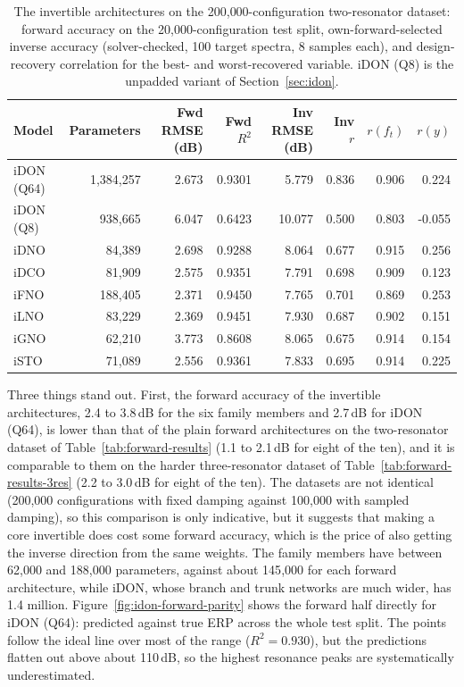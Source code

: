 \begin{table}[h]
\centering
\caption[Invertible operator comparison]{The invertible architectures on the 200{,}000-configuration two-resonator dataset: forward accuracy on the 20{,}000-configuration test split, own-forward-selected inverse accuracy (solver-checked, 100 target spectra, 8 samples each), and design-recovery correlation for the best- and worst-recovered variable. iDON (Q8) is the unpadded variant of Section~\ref{sec:idon}.}
\label{tab:inverse-ifno}
\small
\setlength{\tabcolsep}{4pt}
\begin{tabular}{lrrrrrrr}
\hline
Model & Parameters & Fwd RMSE (dB) & Fwd $R^2$ & Inv RMSE (dB) & Inv $r$ & $r(f_t)$ & $r(y)$ \\
\hline
iDON (Q64) & 1{,}384{,}257 & 2.673 & 0.9301 & 5.779 & 0.836 & 0.906 & 0.224 \\
iDON (Q8)  & 938{,}665 & 6.047 & 0.6423 & 10.077 & 0.500 & 0.803 & -0.055 \\
iDNO       & 84{,}389 & 2.698 & 0.9288 & 8.064 & 0.677 & 0.915 & 0.256 \\
iDCO       & 81{,}909 & 2.575 & 0.9351 & 7.791 & 0.698 & 0.909 & 0.123 \\
iFNO       & 188{,}405 & 2.371 & 0.9450 & 7.765 & 0.701 & 0.869 & 0.253 \\
iLNO       & 83{,}229 & 2.369 & 0.9451 & 7.930 & 0.687 & 0.902 & 0.151 \\
iGNO       & 62{,}210 & 3.773 & 0.8608 & 8.065 & 0.675 & 0.914 & 0.154 \\
iSTO       & 71{,}089 & 2.556 & 0.9361 & 7.833 & 0.695 & 0.914 & 0.225 \\
\hline
\end{tabular}
\end{table}

Three things stand out. First, the forward accuracy of the invertible architectures, 2.4 to 3.8\,dB for the six family members and 2.7\,dB for iDON (Q64), is lower than that of the plain forward architectures on the two-resonator dataset of Table~\ref{tab:forward-results} (1.1 to 2.1\,dB for eight of the ten), and it is comparable to them on the harder three-resonator dataset of Table~\ref{tab:forward-results-3res} (2.2 to 3.0\,dB for eight of the ten). The datasets are not identical (200{,}000 configurations with fixed damping against 100{,}000 with sampled damping), so this comparison is only indicative, but it suggests that making a core invertible does cost some forward accuracy, which is the price of also getting the inverse direction from the same weights. The family members have between 62{,}000 and 188{,}000 parameters, against about 145{,}000 for each forward architecture, while iDON, whose branch and trunk networks are much wider, has 1.4 million. Figure~\ref{fig:idon-forward-parity} shows the forward half directly for iDON (Q64): predicted against true ERP across the whole test split. The points follow the ideal line over most of the range ($R^2 = 0.930$), but the predictions flatten out above about 110\,dB, so the highest resonance peaks are systematically underestimated.

